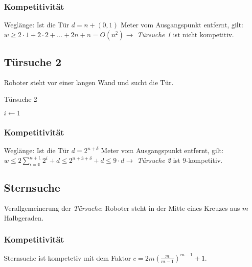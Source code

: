 \subsubsection{Kompetitivität}
Weglänge: Ist die Tür \(d = n + (0,1)\) Meter vom Ausgangspunkt entfernt, gilt:\newline
\(w \geq 2 \cdot 1 + 2 \cdot 2 + ... + 2n +n = O(n^2) \rightarrow\) \textit{Türsuche 1} ist nicht kompetitiv.


\subsection{Türsuche 2}
Roboter steht vor einer langen Wand und sucht die Tür.

\begin{algorithm}[H]
	\caption{Türsuche 2}

	$i \longleftarrow 1$
	\BlankLine
	
\end{algorithm}

\subsubsection{Kompetitivität}
Weglänge: Ist die Tür \(d = 2^{n+\delta}\) Meter vom Ausgangspunkt entfernt, gilt:\newline
\(w \leq 2 \sum\limits_{i=0}^{n+1} 2^i + d \leq 2 ^{n+3+\delta} + d \le 9 \cdot d \rightarrow\) \textit{Türsuche 2} ist 9-kompetitiv.


\subsection{Sternsuche}
Verallgemeinerung der \textit{Türsuche}: Roboter steht in der Mitte eines Kreuzes aus \(m\) Halbgeraden.
\text{}\\


\subsubsection{Kompetitivität}
Sternsuche ist kompetetiv mit dem Faktor \(c = 2m \left(\frac{m}{m-1}\right)^{m-1}+1\).


